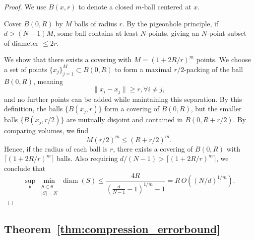 \documentclass{article}
\theoremstyle{plain}
\begin{document}
\begin{proof}
    We use $B(x,r)$ to denote a closed $m$-ball centered at $x$. 
    
    Cover $B(0,R)$ by $M$ balls of radius $r$. By the pigeonhole principle, if $d>(N-1)M$, some ball contains at least $N$ points, giving an $N$-point subset of diameter $\leq 2r$. 

    We show that there exists a covering with $M=(1+2R/r)^m$ points. We choose a set of points $\{x_j\}_{j=1}^M \subset B(0,R)$ to form a maximal $r/2$-packing of the ball $B(0,R)$, meaning
    \begin{equation}
        \|x_i-x_j\|\geq r, \forall i\neq j,
    \end{equation}
    and no further points can be added while maintaining this separation. By this definition, the balls $\{B(x_j,r)\}$ form a covering of $B(0,R)$, but the smaller balls $\{B(x_j,r/2)\}$ are mutually disjoint and contained in $B(0,R+r/2)$. By comparing volumes, we find
    \begin{equation}
        M(r/2)^m \leq (R+r/2)^m.
    \end{equation}
    Hence, if the radius of each ball is $r$, there exists a covering of $B(0,R)$ with $\lceil (1+2R/r)^m \rceil$ balls. Also requiring $d/(N-1) > \lceil (1+2R/r)^m \rceil$, we conclude that
    \begin{equation}
        \sup_{\theta} \min_{\substack{S\subset\theta\\|S|=N}} \operatorname{diam}(S) \leq \frac{4R}{\left(\frac{d}{N-1}-1\right)^{1/m}-1} = R\,O((N/d)^{1/m}) .
    \end{equation}

\end{proof}



\subsection{Theorem~\ref{thm:compression_errorbound}}
\end{document}
